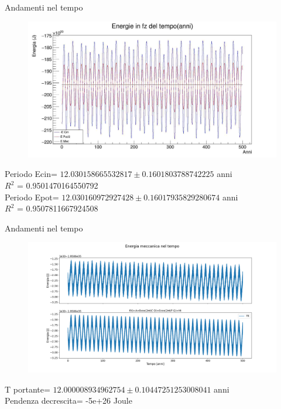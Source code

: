         \begin{frame}{Andamenti nel tempo}
            \begin{figure}
                \centering
                \includegraphics[width=\textwidth]{4_energia/peak/E_tempo.jpg}\\
                \label{cfr::E6T}
            \end{figure}
            Periodo Ecin= $12.030158665532817 \pm 0.1601803788742225$ anni\\
            $R^2$ = 0.9501470164550792\\
            Periodo Epot= $12.030160972927428 \pm 0.16017935829280674$ anni\\
            $R^2$ = 0.9507811667924508
        \end{frame}
        \begin{frame}{Andamenti nel tempo}
            \begin{figure}
                \centering
                \includegraphics[width=\textwidth]{4_energia/peak/mec_500_2.png}\\
                \label{cfr::E6T}    
            \end{figure}  
            T portante= $ 12.000008934962754 \pm 0.10447251253008041$ anni\\
            Pendenza decrescita= -5e+26 Joule
        \end{frame}
